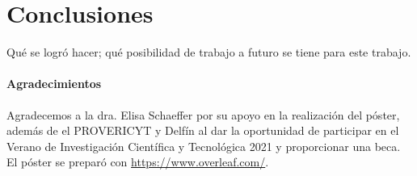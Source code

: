 \documentclass[a4]{sciposter}
\begin{document}
\begin{multicols}{2}
\begin{table}
\setcounter{table}{0} %
\captionsetup{type=table} %
\caption{Aquí explicas cómo interpreta el cuadro.}
\label{data}
\begin{center}
\end{center}
\end{table}

\section{Conclusiones}

Qué se logró hacer; qué posibilidad de trabajo a futuro se tiene para
este trabajo.

\paragraph{Agradecimientos}

{\small Agradecemos a la dra. Elisa Schaeffer por su apoyo en la realización del póster, además de el PROVERICYT y Delfín al dar la oportunidad de participar en el Verano de Investigación Científica y Tecnológica 2021 y proporcionar una beca.
El póster se preparó con \url{https://www.overleaf.com/}.}

\end{multicols}



\end{document}
